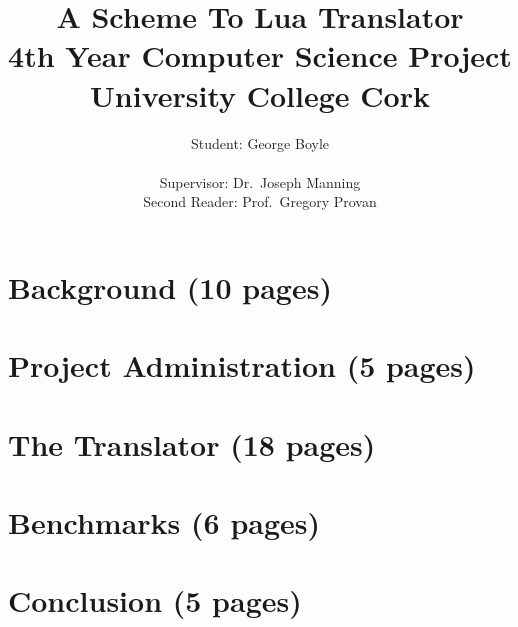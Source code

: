 \documentclass[twoside,a4paper,12pt]{report}
\begin{document}
\title{A Scheme To Lua Translator \\
{\small 4th Year Computer Science Project} \\
{\small University College Cork}}
\author{Student: George Boyle \\ \\
Supervisor: Dr.\ Joseph Manning \\
Second Reader: Prof.\ Gregory Provan}


%
%

\maketitle

\tableofcontents


%
%

\chapter{Background (10 pages)}


\chapter{Project Administration (5 pages)}


\chapter{The Translator (18 pages)}


\chapter{Benchmarks (6 pages)}


\chapter{Conclusion (5 pages)}



%
%


%

%


%
%


\end{document}
